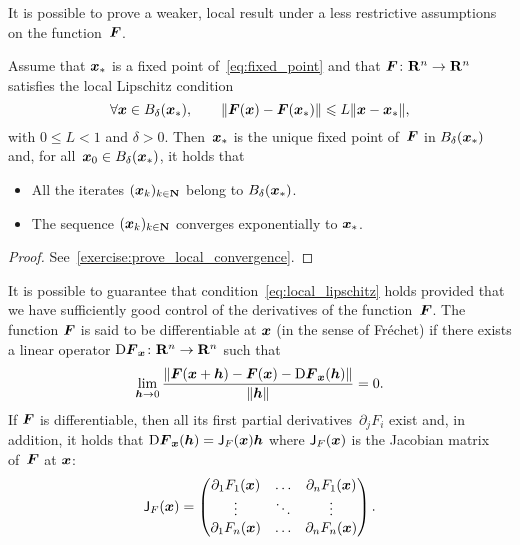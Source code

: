 It is possible to prove a weaker, local result under a less restrictive assumptions on the function~$\mathbf{\boldsymbol{F}}$.
\begin{theorem}
    \label{theorem:local_convergence}
    Assume that $\mathbf{\boldsymbol{x}}_*$ is a fixed point of~\eqref{eq:fixed_point} and that $\mathbf{\boldsymbol{F}}\colon \mathbf R^n \to \mathbf R^n$ satisfies the local Lipschitz condition
    \begin{equation}
        \label{eq:local_lipschitz}
        \forall \vect x \in B_{\delta}(\vect x_*), \qquad
        \norm[big]{\vect F(\vect x) - \vect F(\vect x_*)} \leq L \norm{\vect x - \vect x_*},
    \end{equation}
    with $0 \leq L < 1$ and $\delta > 0$.
    Then~$\mathbf{\boldsymbol{x}}_*$ is the unique fixed point of~$\mathbf{\boldsymbol{F}}$ in $B_{\delta}(\mathbf{\boldsymbol{x}}_*)$ and,
    for all~$\mathbf{\boldsymbol{x}}_0 \in B_{\delta}(\mathbf{\boldsymbol{x}}_*)$, it holds that
    \begin{itemize}
        \item All the iterates $(\mathbf{\boldsymbol{x}}_k)_{k \in \mathbf N}$ belong to $B_{\delta}(\mathbf{\boldsymbol{x}}_*)$.
        \item The sequence $(\mathbf{\boldsymbol{x}}_k)_{k \in \mathbf N}$ converges exponentially to $\mathbf{\boldsymbol{x}}_*$.
    \end{itemize}
\end{theorem}
\begin{proof}
    See~\cref{exercise:prove_local_convergence}.
\end{proof}
It is possible to guarantee that condition~\eqref{eq:local_lipschitz} holds provided that
we have sufficiently good control of the derivatives of the function~$\mathbf{\boldsymbol{F}}$.
The function $\mathbf{\boldsymbol{F}}$ is said to be differentiable at $\mathbf{\boldsymbol{x}}$ (in the sense of Fréchet) if
there exists a linear operator $\mathrm D \mathbf{\boldsymbol{F}}_{\mathbf{\boldsymbol{x}}} \colon \mathbf R^n \to \mathbf R^n$ such that
\begin{equation}
    \label{eq:limit_differentiability}
    \lim_{\mathbf{\boldsymbol{h}} \to 0} \frac{\lVert\mathbf{\boldsymbol{F}}(\mathbf{\boldsymbol{x}} + \mathbf{\boldsymbol{h}}) - \mathbf{\boldsymbol{F}}(\mathbf{\boldsymbol{x}}) - \mathrm D \mathbf{\boldsymbol{F}}_{\mathbf{\boldsymbol{x}}}(\mathbf{\boldsymbol{h}})\rVert}{\lVert\mathbf{\boldsymbol{h}}\rVert}
    = 0.
\end{equation}
If $\mathbf{\boldsymbol{F}}$ is differentiable,
then all its first partial derivatives~$\partial_j F_i$ exist and,
in addition, it holds that $\mathrm D \mathbf{\boldsymbol{F}}_{\mathbf{\boldsymbol{x}}}(\mathbf{\boldsymbol{h}}) = \mathsf J_F(\mathbf{\boldsymbol{x}}) \mathbf{\boldsymbol{h}}$
where $\mathsf J_F(\mathbf{\boldsymbol{x}})$ is the Jacobian matrix of~$\mathbf{\boldsymbol{F}}$ at $\mathbf{\boldsymbol{x}}$:
\[
    \mathsf J_F(\mathbf{\boldsymbol{x}}) =
    \begin{pmatrix}
        \partial_{1} F_1(\mathbf{\boldsymbol{x}}) & \hdots & \partial_n F_1(\mathbf{\boldsymbol{x}}) \\
        \vdots & \ddots & \vdots \\
        \partial_{1} F_n(\mathbf{\boldsymbol{x}}) & \hdots & \partial_n F_n(\mathbf{\boldsymbol{x}})
    \end{pmatrix}.
\]

